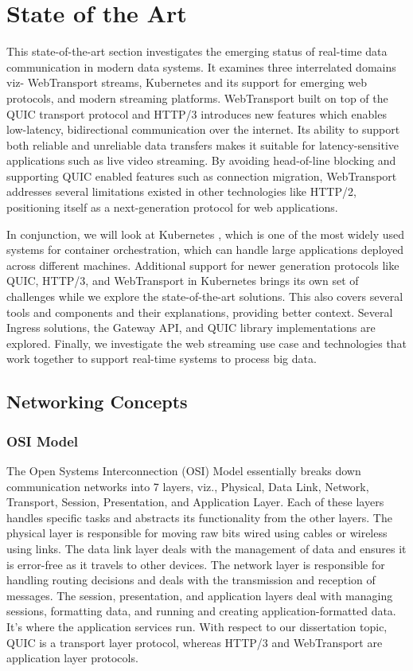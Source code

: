 \chapter{State of the Art}

This state-of-the-art section investigates the emerging status of real-time data communication in modern data systems. It examines three interrelated domains viz- WebTransport streams, Kubernetes and its support for emerging web protocols, and modern streaming platforms. WebTransport \cite{webtransport-draft} built on top of the QUIC transport protocol \cite{rfc9000} and HTTP/3 \cite{rfc9114} introduces new features which enables low-latency, bidirectional communication over the internet. Its ability to support both reliable and unreliable data transfers makes it suitable for latency-sensitive applications such as live video streaming. By avoiding head-of-line blocking and supporting QUIC enabled features such as connection migration, WebTransport addresses several limitations existed in other technologies like HTTP/2, positioning itself as a next-generation protocol for web applications.


In conjunction, we will look at Kubernetes \cite{kubernetes-docs}, which is one of the most widely used systems for container orchestration, which can handle large applications deployed across different machines. Additional support for newer generation protocols like QUIC, HTTP/3, and WebTransport in Kubernetes brings its own set of challenges while we explore the state-of-the-art solutions. This also covers several tools and components and their explanations, providing better context. Several Ingress solutions, the Gateway API, and QUIC library implementations are explored. Finally, we investigate the web streaming use case and technologies that work together to support real-time systems to process big data.




\section{Networking Concepts}
\subsection{OSI Model}
The Open Systems Interconnection (OSI) Model \cite{kurose2017} essentially breaks down communication networks into 7 layers, viz., Physical, Data Link, Network, Transport, Session, Presentation, and Application Layer. Each of these layers handles specific tasks and abstracts its functionality from the other layers. The physical layer is responsible for moving raw bits wired using cables or wireless using links. The data link layer deals with the management of data and ensures it is error-free as it travels to other devices. The network layer is responsible for handling routing decisions and deals with the transmission and reception of messages. The session, presentation, and application layers deal with managing sessions, formatting data, and running and creating application-formatted data. It's where the application services run. With respect to our dissertation topic, QUIC is a transport layer protocol, whereas HTTP/3 and WebTransport are application layer protocols.


